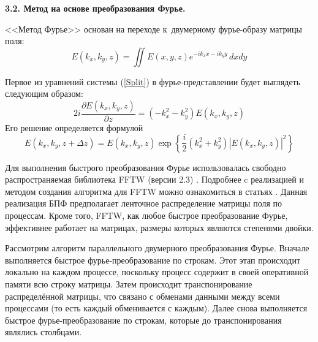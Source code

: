 \vspace{1em}
\textbf{3.2. Метод на основе преобразования Фурье.}
\vspace{0.5em}

<<Метод Фурье>> основан на переходе к~двумерному фурье-образу матрицы поля:
\begin{equation}\label{FourierDef}
    E\left(k_x, k_y, z\right)=\iint E\left(x,y,z\right)e^{-ik_xx-ik_yy}\,dxdy
\end{equation}

Первое из уравнений системы (\ref{Split}) в фурье-представлении будет выглядеть следующим образом:
\begin{equation}\label{DiffractionFourier}
    2i\frac{\partial E\left(k_x, k_y, z\right)}{\partial z}= (-k_x^2-k_y^2)E\left(k_x, k_y, z\right)
\end{equation}
Его решение определяется формулой
\begin{equation}\label{DiffractionFourierSolve}
    E\left(k_x, k_y, z+\Delta z\right)= E\left(k_x, k_y, z\right)\exp\left\{\dfrac{i}{2}(k_x^2+k_y^2)\left|E\left(k_x, k_y, z\right)\right|^2\right\}
\end{equation}

Для выполнения быстрого преобразования Фурье использовалась свободно распространяемая библиотека FFTW (версии 2.3) \cite{FFTW}.
Подробнее c реализацией и методом создания алгоритма для FFTW можно ознакомиться в статьях \cite{FFTW2_Generator_99, FFTW1_98}.
Данная реализация БПФ предполагает ленточное распределение матрицы поля по процессам.
Кроме того, FFTW, как любое быстрое преобразование Фурье, эффективнее работает на матрицах, размеры которых являются степенями двойки.

Рассмотрим алгоритм параллельного двумерного преобразования Фурье.
Вначале выполняется быстрое фурье-преобразование по строкам.
Этот этап происходит локально на каждом процессе, поскольку процесс содержит в своей оперативной памяти всю строку матрицы.
Затем происходит транспонирование распределённой матрицы, что связано с обменами данными между всеми процессами (то есть каждый обменивается с каждым).
Далее снова выполняется быстрое фурье-преобразование по строкам, которые до транспонирования являлись столбцами.

